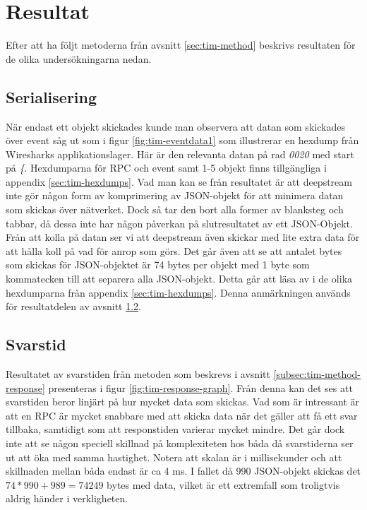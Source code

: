 \section{Resultat}
\label{sec:tim-results}
Efter att ha följt metoderna från avsnitt \ref{sec:tim-method} beskrivs resultaten för de olika undersökningarna nedan. 

\subsection{Serialisering}
När endast ett objekt skickades kunde man observera att datan som skickades över event såg ut som i figur \ref{fig:tim-eventdata1} som illustrerar en hexdump från Wiresharks applikationslager. Här är den relevanta datan på rad \textit{0020} med start på \textit{\{}. Hexdumparna för RPC och event samt 1-5 objekt finns tillgängliga i appendix \ref{sec:tim-hexdumps}. Vad man kan se från resultatet är att deepstream inte gör någon form av komprimering av JSON-objekt för att minimera datan som skickas över nätverket. Dock så tar den bort alla former av blanksteg och tabbar, då dessa inte har någon påverkan på slutresultatet av ett JSON-Objekt. Från att kolla på datan ser vi att deepstream även skickar med lite extra data för att hålla koll på vad för anrop som görs. Det går även att se att antalet bytes som skickas för JSON-objektet är 74 bytes per objekt med 1 byte som kommatecken till att separera alla JSON-objekt. Detta går att läsa av i de olika hexdumparna från appendix \ref{sec:tim-hexdumps}. Denna anmärkningen används för resultatdelen av avsnitt \ref{subsec:tim-result-response}.

\subsection{Svarstid}
\label{subsec:tim-result-response}
Resultatet av svarstiden från metoden som beskrevs i avsnitt \ref{subsec:tim-method-response} presenteras i figur \ref{fig:tim-response-graph}. Från denna kan det ses att svarstiden beror linjärt på hur mycket data som skickas. Vad som är intressant är att en RPC är mycket snabbare med att skicka data när det gäller att få ett svar tillbaka, samtidigt som att responstiden varierar mycket mindre. Det går dock inte att se någon speciell skillnad på komplexiteten hos båda då svarstiderna ser ut att öka med samma hastighet. Notera att skalan är i millisekunder och att skillnaden mellan båda endast är ca 4 ms. I fallet då 990 JSON-objekt skickas det $74*990+989=74249$ bytes med data, vilket är ett extremfall som troligtvis aldrig händer i verkligheten.

